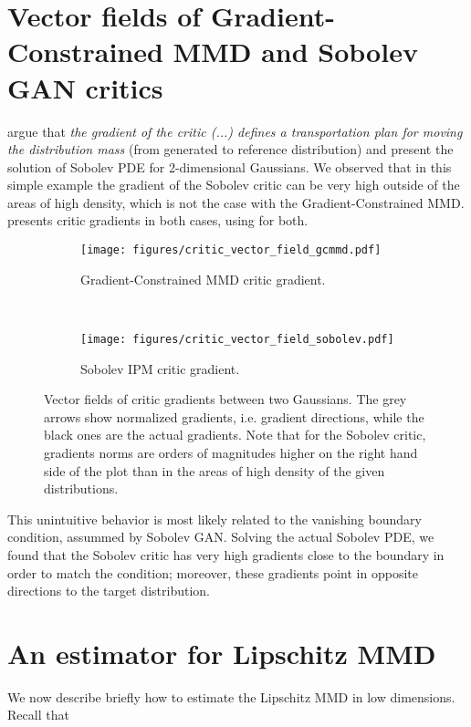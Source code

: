 \documentclass{article}
\let\citet\textcite
\begin{document}
\section{Vector fields of Gradient-Constrained MMD and Sobolev GAN critics} \label{appendix:critic-vector-fields}
\citet{sobolev-gan} argue that \emph{the gradient of the critic (...) defines a transportation plan
for moving the distribution mass} (from generated to reference distribution) and present
the solution of Sobolev PDE for 2-dimensional Gaussians. We observed that in this simple example
the gradient of the Sobolev critic can be very high outside of the areas of high density,
which is not the case with the Gradient-Constrained MMD.
presents critic gradients in both cases,
using  for both.
\begin{figure}[ht]
\centering
    \begin{subfigure}[t]{.48\linewidth}
        \centering
        \texttt{[image: figures/critic\_vector\_field\_gcmmd.pdf]}
        \caption{Gradient-Constrained MMD critic gradient.}
    \end{subfigure}
    ~
    \begin{subfigure}[t]{.48\linewidth}
        \centering
        \texttt{[image: figures/critic\_vector\_field\_sobolev.pdf]}
        \caption{Sobolev IPM critic gradient.}
    \end{subfigure}
    \caption{Vector fields of critic gradients between two Gaussians. The grey arrows show
normalized gradients, i.e. gradient directions, while the black ones are the actual gradients.
Note that for the Sobolev critic, gradients norms are orders of magnitudes higher on the right hand side
of the plot than in the areas of high density of the given distributions.}
    \label{fig:critic_vector_fields}
\end{figure}

This unintuitive behavior is most likely
related to the vanishing boundary condition, assummed by Sobolev GAN. Solving the actual Sobolev PDE,
we found that the Sobolev critic has very high gradients close to the boundary in order to match
the condition; moreover, these gradients point in opposite directions to the target distribution.


\section{An estimator for Lipschitz MMD} \label{sec:est-lipmmd}
We now describe briefly how to estimate the Lipschitz MMD in low dimensions.
Recall that
\end{document}
